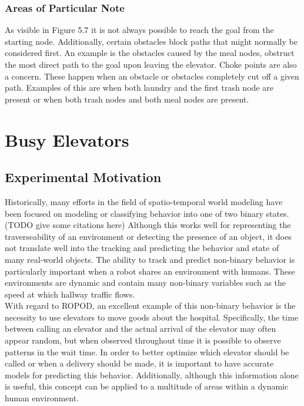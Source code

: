   \subsubsection{ Areas of Particular Note }

  As visible in Figure 5.7 it is not always possible to reach the goal from the
  starting node. Additionally, certain obstacles block paths that might
  normally be considered first. An example is the obstacles caused by
  the meal nodes, obstruct the most direct path to the goal upon leaving
  the elevator. Choke points are also a concern. These happen when an obstacle
  or obstacles completely cut off a given path. Examples of this are when both
  laundry and the first trash node are present or when both trash nodes and both
  meal nodes are present.
  \clearpage





  \section{ Busy Elevators }

  \subsection{ Experimental Motivation }

  Historically, many efforts in the field of spatio-temporal world modeling
  have been focused on modeling or classifying behavior into one of two binary
  states. (TODO give some citations here) Although this works well for
  representing the traverseability of an environment or detecting the presence of an object,
  it does not translate well into the tracking and predicting the behavior and
  state of many real-world objects. The ability to track and predict
  non-binary behavior is particularly important when a robot shares an
  environment with humans. These environments are dynamic and contain many
  non-binary variables such as the speed at which hallway traffic flows. \\

  With regard to ROPOD, an excellent example of this non-binary
  behavior is the necessity to use elevators to move goods about the hospital.
  Specifically, the time between calling an elevator and the actual arrival of
  the elevator may often appear random, but when observed throughout time
  it is possible to observe patterns in the wait time. In order to better
  optimize which elevator should be called or when a delivery should be made, it
  is important to have accurate models for predicting this behavior.
  Additionally, although this information alone is useful, this concept can
  be applied to a multitude of areas within a dynamic human environment. \\

